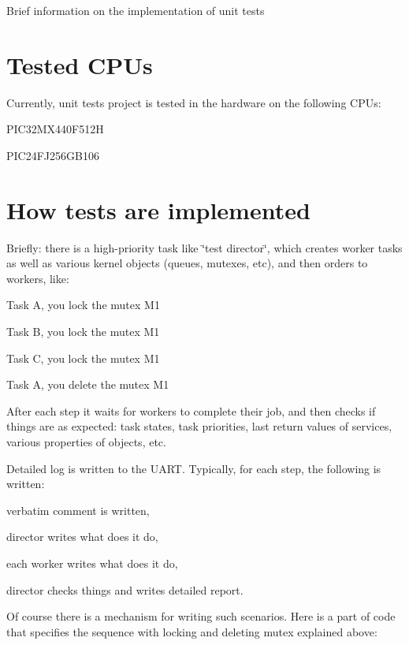 Brief information on the implementation of unit tests\hypertarget{unit_tests_tested_cpus}{}\section{Tested C\+P\+Us}\label{unit_tests_tested_cpus}
Currently, unit tests project is tested in the hardware on the following C\+P\+Us\+:


\begin{DoxyItemize}
\item P\+I\+C32\+M\+X440\+F512\+H
\item P\+I\+C24\+F\+J256\+G\+B106
\end{DoxyItemize}\hypertarget{unit_tests_how_tests_are_implemented}{}\section{How tests are implemented}\label{unit_tests_how_tests_are_implemented}
Briefly\+: there is a high-\/priority task like \char`\"{}test director\char`\"{}, which creates worker tasks as well as various kernel objects (queues, mutexes, etc), and then orders to workers, like\+:


\begin{DoxyItemize}
\item Task A, you lock the mutex M1
\item Task B, you lock the mutex M1
\item Task C, you lock the mutex M1
\item Task A, you delete the mutex M1
\end{DoxyItemize}

After each step it waits for workers to complete their job, and then checks if things are as expected\+: task states, task priorities, last return values of services, various properties of objects, etc.

Detailed log is written to the U\+A\+R\+T. Typically, for each step, the following is written\+:


\begin{DoxyItemize}
\item verbatim comment is written,
\item director writes what does it do,
\item each worker writes what does it do,
\item director checks things and writes detailed report.
\end{DoxyItemize}

Of course there is a mechanism for writing such scenarios. Here is a part of code that specifies the sequence with locking and deleting mutex explained above\+:


